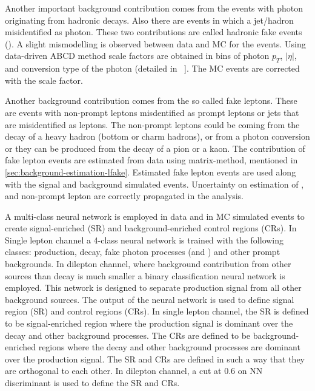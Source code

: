 Another important background contribution comes from the events with photon originating from hadronic decays. Also there are events in which a jet/hadron misidentified as photon. These two contributions are called hadronic fake events (\hfake). A slight mismodelling is observed between data and MC for the \hfake events. Using data-driven ABCD method scale factors are obtained in bins of photon $p_T$, $|\eta|$, and conversion type of the photon (detailed in ~\cite{DiezPardos:2781712}]. The \hfake MC events are corrected with the scale factor.

Another background contribution comes from the so called fake leptons. These are events with non-prompt leptons misdentified as prompt leptons or jets that are misidentified as leptons. The non-prompt leptons could be coming from the decay of a heavy hadron (bottom or charm hadrons), or from a photon conversion or they can be produced from the decay of a pion or a kaon. The contribution of fake lepton events are estimated from data using matrix-method, mentioned in \cref{sec:background-estimation-lfake}. Estimated fake lepton events are used along with the signal and background simulated events. Uncertainty on estimation of \efake, \hfake and non-prompt lepton are correctly propagated in the analysis.

A multi-class neural network is employed in data and in MC simulated events to create signal-enriched (SR) and background-enriched control regions (CRs). In Single lepton channel a 4-class neural network is trained with the following classes: \tty production, \tty decay, fake photon processes (\efake and \hfake) and other prompt backgrounds. In dilepton channel, where background contribution from other sources than \tty decay is much smaller a binary classification neural network is employed. This network is designed to separate \tty production signal from all other background sources. The output of the neural network is used to define signal region (SR) and control regions (CRs). In single lepton channel, the SR is defined to be signal-enriched region where the \tty production signal is dominant over the \tty decay and other background processes. The CRs are defined to be background-enriched regions where the \tty decay and other background processes are dominant over the \tty production signal. The SR and CRs are defined in such a way that they are orthogonal to each other. In dilepton channel, a cut at 0.6 on NN discriminant is used to define the SR and CRs. 

